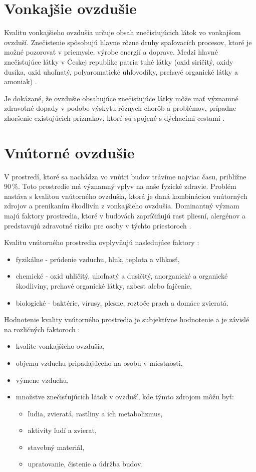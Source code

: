 \section{Vonkajšie ovzdušie}
Kvalitu vonkajšieho ovzdušia určuje obsah znečisťujúcich látok vo vonkajšom ovzduší. Znečistenie spôsobujú hlavne rôzne druhy spaľovacích procesov, ktoré je možné pozorovať v priemysle, výrobe energií a doprave. Medzi hlavné znečisťujúce látky v Českej republike patria tuhé látky (oxid siričitý, oxidy dusíka, oxid uhoľnatý, polyaromatické uhľovodíky, prchavé organické látky a amoniak) \cite{KvalitaVzduchu}. 

Je dokázané, že ovzdušie obsahujúce znečisťujúce látky môže mať významné zdravotné dopady v podobe výskytu rôznych chorôb a problémov, prípadne zhoršenie existujúcich príznakov, ktoré sú spojené s dýchacími cestami \cite{VonkajsieOvzdusie}. 

\section{Vnútorné ovzdušie}
V prostredí, ktoré sa nachádza vo vnútri budov trávime najviac času, približne 90\,\%. Toto prostredie má významný vplyv na naše fyzické zdravie. Problém nastáva s kvalitou vnútorného ovzdušia, ktorá je daná kombináciou vnútorných zdrojov a prenikaním škodlivín z vonkajšieho ovzdušia. Dominantný význam majú faktory prostredia, ktoré v budovách zapríčiňujú rast pliesní, alergénov a predstavujú zdravotné riziko pre osoby v týchto priestoroch \cite{VnutorneOvzdusie}.

Kvalitu vnútorného prostredia ovplyvňujú nasledujúce faktory \cite{IndoorAirQualityAndHealt}:
\begin{itemize}
    \item fyzikálne - prúdenie vzduchu, hluk, teplota a vlhkosť,
    \item chemické - oxid uhličitý, uhoľnatý a dusičitý, anorganické a organické škodliviny, prchavé organické látky, azbest alebo fajčenie,
    \item biologické - baktérie, vírusy, plesne, roztoče prach a domáce zvieratá.
\end{itemize}

Hodnotenie kvality vnútorného prostredia je subjektívne hodnotenie a je závislé na rozličných faktoroch \cite{KvalitaVnutornehoProstredia}:
\begin{itemize}
    \item kvalite vonkajšieho ovzdušia,
    \item objemu vzduchu pripadajúceho na osobu v miestnosti,
    \item výmene vzduchu,
    \item množstve znečisťujúcich látok v ovzduší, kde týmto zdrojom môžu byť:
    \begin{itemize}
        \item ľudia, zvieratá, rastliny a ich metabolizmus,
        \item aktivity ľudí a zvierat,
        \item stavebný materiál,
        \item upratovanie, čistenie a údržba budov.
    \end{itemize}
\end{itemize}

